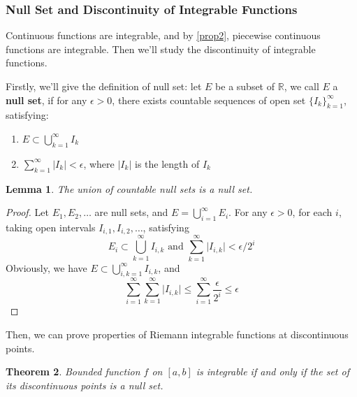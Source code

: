 \documentclass[a4paper]{article}
\newtheorem{theorem}{Theorem}[subsection]
\newtheorem{lemma}[theorem]{Lemma}
\numberwithin{equation}{subsection}
\begin{document}
\subsubsection{Null Set and Discontinuity of Integrable Functions}

\par Continuous functions are integrable, and by \cref{prop2}, piecewise continuous functions are integrable. Then we'll study the discontinuity of integrable functions.

\par Firstly, we'll give the definition of null set: let $E$ be a subset of $\mathbb{R}$, we call $E$ a \textbf{null set}, if for any $\epsilon>0$, there exists countable sequences of open set $\{I_k\}_{k=1}^\infty$, satisfying:
\begin{enumerate}
    \item $E \subset \bigcup_{k=1}^\infty I_k$
    \item $\sum_{k=1}^{\infty} \lvert I_k \rvert < \epsilon$, where $\lvert I_k \rvert$ is the length of $I_k$
\end{enumerate}

\begin{lemma}
    The union of countable null sets is a null set.
\end{lemma}
\begin{proof}
    Let $E_1, E_2, \dots$ are null sets, and $E = \bigcup_{i=1}^\infty E_i$. For any $\epsilon>0$, for each $i$, taking open intervals $I_{i, 1}, I_{i, 2}, \dots$, satisfying
    \begin{equation}
        E_i \subset \bigcup_{k=1}^\infty I_{i, k} \text{ and } \sum_{k=1}^\infty \lvert I_{i, k} \rvert < \epsilon / 2^i
    \end{equation}
    Obviously, we have $E \subset \bigcup_{i, k=1}^\infty I_{i, k}$, and
    \begin{equation}
        \sum_{i=1}^\infty \sum_{k=1}^\infty \lvert I_{i, k} \rvert \leq \sum_{i=1}^{\infty} \frac{\epsilon}{2^i} \leq \epsilon
    \end{equation}
\end{proof}

\par Then, we can prove properties of Riemann integrable functions at discontinuous points.

\begin{theorem}
    \label{thm:1}
    Bounded function $f$ on $[a, b]$ is integrable if and only if the set of its discontinuous points is a null set.
\end{theorem}
\end{document}
